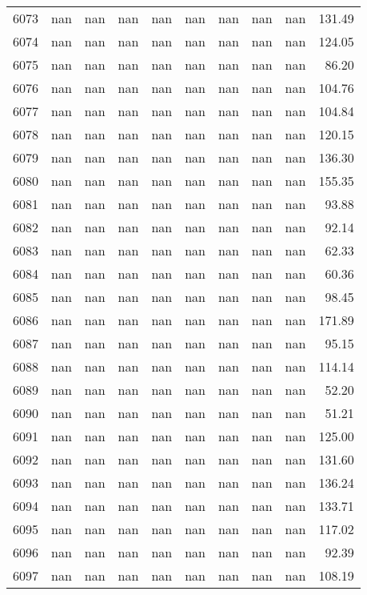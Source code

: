 \begin{tabular}{lrrrrrrrrr}
6073 & nan & nan & nan & nan & nan & nan & nan & nan & 131.49 \\
6074 & nan & nan & nan & nan & nan & nan & nan & nan & 124.05 \\
6075 & nan & nan & nan & nan & nan & nan & nan & nan & 86.20 \\
6076 & nan & nan & nan & nan & nan & nan & nan & nan & 104.76 \\
6077 & nan & nan & nan & nan & nan & nan & nan & nan & 104.84 \\
6078 & nan & nan & nan & nan & nan & nan & nan & nan & 120.15 \\
6079 & nan & nan & nan & nan & nan & nan & nan & nan & 136.30 \\
6080 & nan & nan & nan & nan & nan & nan & nan & nan & 155.35 \\
6081 & nan & nan & nan & nan & nan & nan & nan & nan & 93.88 \\
6082 & nan & nan & nan & nan & nan & nan & nan & nan & 92.14 \\
6083 & nan & nan & nan & nan & nan & nan & nan & nan & 62.33 \\
6084 & nan & nan & nan & nan & nan & nan & nan & nan & 60.36 \\
6085 & nan & nan & nan & nan & nan & nan & nan & nan & 98.45 \\
6086 & nan & nan & nan & nan & nan & nan & nan & nan & 171.89 \\
6087 & nan & nan & nan & nan & nan & nan & nan & nan & 95.15 \\
6088 & nan & nan & nan & nan & nan & nan & nan & nan & 114.14 \\
6089 & nan & nan & nan & nan & nan & nan & nan & nan & 52.20 \\
6090 & nan & nan & nan & nan & nan & nan & nan & nan & 51.21 \\
6091 & nan & nan & nan & nan & nan & nan & nan & nan & 125.00 \\
6092 & nan & nan & nan & nan & nan & nan & nan & nan & 131.60 \\
6093 & nan & nan & nan & nan & nan & nan & nan & nan & 136.24 \\
6094 & nan & nan & nan & nan & nan & nan & nan & nan & 133.71 \\
6095 & nan & nan & nan & nan & nan & nan & nan & nan & 117.02 \\
6096 & nan & nan & nan & nan & nan & nan & nan & nan & 92.39 \\
6097 & nan & nan & nan & nan & nan & nan & nan & nan & 108.19 \\

\end{tabular}
